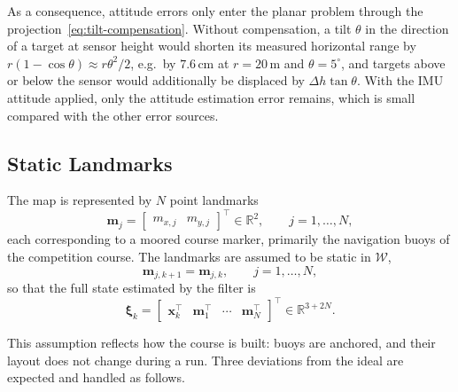 As a consequence, attitude errors only enter the planar problem through the
projection~\eqref{eq:tilt-compensation}. Without compensation, a tilt
$\theta$ in the direction of a target at sensor height would shorten its
measured horizontal range by $r(1-\cos\theta) \approx r\theta^2/2$, e.g.\
by $7.6\,\mathrm{cm}$ at $r = 20\,\mathrm{m}$ and $\theta = 5^\circ$, and
targets above or below the sensor would additionally be displaced by
$\Delta h \tan\theta$. With the IMU attitude applied, only the attitude
estimation error remains, which is small compared with the other error
sources.

\subsection{Static Landmarks}
\label{sec:assumption-static}

The map is represented by $N$ point landmarks
\begin{equation}
  \mathbf{m}_j =
  \begin{bmatrix} m_{x,j} & m_{y,j} \end{bmatrix}^{\top} \in \mathbb{R}^2,
  \qquad j = 1, \dots, N,
  \label{eq:landmark}
\end{equation}
each corresponding to a moored course marker, primarily the navigation
buoys of the competition course. The landmarks are assumed to be static in
$\mathcal{W}$,
\begin{equation}
  \mathbf{m}_{j,k+1} = \mathbf{m}_{j,k}, \qquad j = 1, \dots, N,
  \label{eq:static-landmarks}
\end{equation}
so that the full state estimated by the filter is
\begin{equation}
  \boldsymbol{\xi}_k =
  \begin{bmatrix}
    \mathbf{x}_k^{\top} & \mathbf{m}_1^{\top} & \cdots & \mathbf{m}_N^{\top}
  \end{bmatrix}^{\top} \in \mathbb{R}^{3+2N}.
  \label{eq:slam-state}
\end{equation}

This assumption reflects how the course is built: buoys are anchored, and
their layout does not change during a run. Three deviations from the ideal
are expected and handled as follows.

